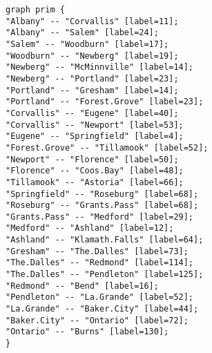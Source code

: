 \documentclass[12pt]{article}
\begin{document}
\begin{lstlisting}
graph prim {
"Albany" -- "Corvallis" [label=11];
"Albany" -- "Salem" [label=24];
"Salem" -- "Woodburn" [label=17];
"Woodburn" -- "Newberg" [label=19];
"Newberg" -- "McMinnville" [label=14];
"Newberg" -- "Portland" [label=23];
"Portland" -- "Gresham" [label=14];
"Portland" -- "Forest.Grove" [label=23];
"Corvallis" -- "Eugene" [label=40];
"Corvallis" -- "Newport" [label=53];
"Eugene" -- "Springfield" [label=4];
"Forest.Grove" -- "Tillamook" [label=52];
"Newport" -- "Florence" [label=50];
"Florence" -- "Coos.Bay" [label=48];
"Tillamook" -- "Astoria" [label=66];
"Springfield" -- "Roseburg" [label=68];
"Roseburg" -- "Grants.Pass" [label=68];
"Grants.Pass" -- "Medford" [label=29];
"Medford" -- "Ashland" [label=12];
"Ashland" -- "Klamath.Falls" [label=64];
"Gresham" -- "The.Dalles" [label=73];
"The.Dalles" -- "Redmond" [label=114];
"The.Dalles" -- "Pendleton" [label=125];
"Redmond" -- "Bend" [label=16];
"Pendleton" -- "La.Grande" [label=52];
"La.Grande" -- "Baker.City" [label=44];
"Baker.City" -- "Ontario" [label=72];
"Ontario" -- "Burns" [label=130];
}
\end{lstlisting}
\end{document}
